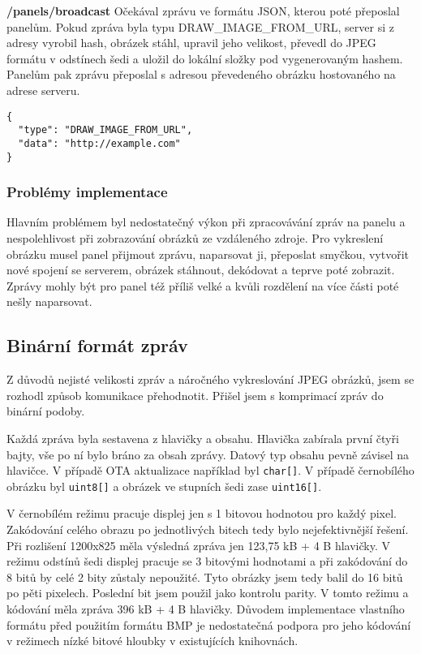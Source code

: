 \textbf{/panels/broadcast} Očekával zprávu ve formátu JSON, kterou poté přeposlal panelům. Pokud zpráva byla typu DRAW\_IMAGE\_FROM\_URL, server si z adresy vyrobil hash, obrázek stáhl, upravil jeho velikost, převedl do JPEG formátu v odstínech šedi a uložil do lokální složky pod vygenerovaným hashem. Panelům pak zprávu přeposlal s adresou převedeného obrázku hostovaného na adrese serveru.

\vspace{1cm}

\begin{lstlisting}[label=src:hamilton-json-message,caption={Ukázka zprávy pro vykreslení obrázku v projektu Hamilton}]
{
  "type": "DRAW_IMAGE_FROM_URL",
  "data": "http://example.com"
}
\end{lstlisting}

\subsubsection{Problémy implementace}
Hlavním problémem byl nedostatečný výkon při zpracovávání zpráv na panelu a nespolehlivost při zobrazování obrázků ze vzdáleného zdroje. Pro vykreslení obrázku musel panel přijmout zprávu, naparsovat ji, přeposlat smyčkou, vytvořit nové spojení se serverem, obrázek stáhnout, dekódovat a teprve poté zobrazit. Zprávy mohly být pro panel též příliš velké a kvůli rozdělení na více části poté nešly naparsovat.

\subsection{Binární formát zpráv}\label{binarni-format-navrh}
Z důvodů nejisté velikosti zpráv a náročného vykreslování JPEG obrázků, jsem se rozhodl způsob komunikace přehodnotit. Přišel jsem s komprimací zpráv do binární podoby.

Každá zpráva byla sestavena z hlavičky a obsahu. Hlavička zabírala první čtyři bajty, vše po ní bylo bráno za obsah zprávy. Datový typ obsahu pevně závisel na hlavičce. V případě OTA aktualizace například byl \lstinline|char[]|. V případě černobílého obrázku byl \lstinline|uint8[]| a obrázek ve stupních šedi zase \lstinline|uint16[]|.

V černobílém režimu pracuje displej jen s 1 bitovou hodnotou pro každý pixel. Zakódování celého obrazu po jednotlivých bitech tedy bylo nejefektivnější řešení. Při rozlišení 1200x825 měla výsledná zpráva jen 123,75 kB + 4 B hlavičky. V režimu odstínů šedi displej pracuje se 3 bitovými hodnotami a při zakódování do 8 bitů by celé 2 bity zůstaly nepoužité. Tyto obrázky jsem tedy balil do 16 bitů po pěti pixelech. Poslední bit jsem použil jako kontrolu parity. V tomto režimu a kódování měla zpráva 396 kB + 4 B hlavičky. Důvodem implementace vlastního formátu před použitím formátu BMP je nedostatečná podpora pro jeho kódování v režimech nízké bitové hloubky v existujících knihovnách.

